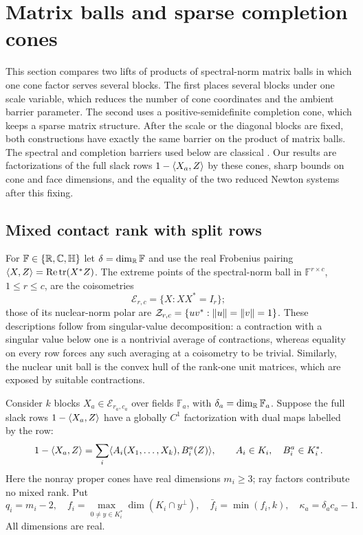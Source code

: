 \section{Matrix balls and sparse completion cones}
\label{sec:spectral-chordal}

This section compares two lifts of products of spectral-norm matrix
balls in which one cone factor serves several blocks.  The first places
several blocks under one scale variable, which reduces the number
of cone coordinates and the ambient barrier parameter.  The second uses a
positive-semidefinite completion cone, which keeps a sparse matrix
structure.  After the scale or the diagonal blocks are fixed, both
constructions have exactly the same barrier on the product of matrix balls.
The spectral and completion barriers used below are classical
\citep{CKV2022natural,ADV2013}.  Our results are factorizations of the
full slack rows $1-\langle X_a,Z\rangle$ by these cones, sharp bounds on cone and
face dimensions, and the equality of the two reduced Newton systems after
this fixing.

\subsection{Mixed contact rank with split rows}

For $\mathbb F\in\{\mathbb R,\mathbb C,\mathbb H\}$ let
$\delta=\dim_{\mathbb R}\mathbb F$ and use the real Frobenius pairing
$\langle X,Z\rangle=\operatorname{Re}\operatorname{tr}(X^*Z)$.
The extreme points of the spectral-norm ball in
$\mathbb F^{r\times c}$, $1\leq r\leq c$, are the coisometries
\[
 \mathcal E_{r,c}=\{X:XX^*=I_r\};
\]
those of its nuclear-norm polar are
$\mathcal Z_{r,c}=\{uv^*:\lVert u\rVert=\lVert v\rVert=1\}$.
These descriptions follow from singular-value decomposition: a contraction
with a singular value below one is a nontrivial average of contractions,
whereas equality on every row forces any such averaging at a coisometry
to be trivial.  Similarly, the nuclear unit ball is the convex hull of the
rank-one unit matrices, which are exposed by suitable contractions.

Consider $k$ blocks $X_a\in\mathcal E_{r_a,c_a}$ over fields
$\mathbb F_a$, with $\delta_a=\dim_{\mathbb R}\mathbb F_a$.  Suppose the full
slack rows $1-\langle X_a,Z\rangle$ have a globally $C^1$ factorization with
dual maps labelled by the row:
\begin{equation}\label{eq:spectral-split-slack}
 1-\langle X_a,Z\rangle
 =\sum_i\langle A_i(X_1,\ldots,X_k),B_i^a(Z)\rangle,
 \qquad A_i\in K_i,\quad B_i^a\in K_i^*.
\end{equation}
Here the nonray proper cones have real dimensions $m_i\geq3$;
ray factors contribute no mixed rank.  Put
\[
 q_i=m_i-2,\quad
 f_i=\max_{0\ne y\in K_i^*}\dim(K_i\cap y^\perp),\quad
 \bar f_i=\min(f_i,k),\quad \kappa_a=\delta_a c_a-1.
\]
All dimensions are real.

